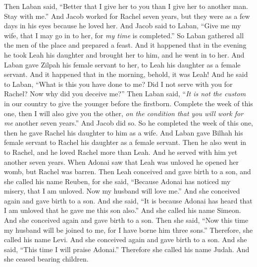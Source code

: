 \begin{biblechapter}
\verse Then Laban said, “Better that I give her to you than I give her to another man. Stay with me.”
\verse And Jacob worked for Rachel seven years, but they were as a few days in his eyes because he loved her.
\verse And Jacob said to Laban, “Give me my wife, that I may go in to her, for \textit{my time} is completed.”
\verse So Laban gathered all the men of the place and prepared a feast.
\verse And it happened that in the evening he took Leah his daughter and brought her to him, and he went in to her.
\verse And Laban gave Zilpah his female servant to her, to Leah his daughter as a female servant.
\verse And it happened that in the morning, behold, it was Leah! And he said to Laban, “What is this you have done to me? Did I not serve with you for Rachel? Now why did you deceive me?”
\verse Then Laban said, “\textit{It is not the custom} in our country to give the younger before the firstborn.
\verse Complete the week of this one, then I will also give you the other, \textit{on the condition that you will work for me} another seven years.”
\verse And Jacob did so. So he completed the week of this one, then he gave Rachel his daughter to him as a wife.
\verse And Laban gave Bilhah his female servant to Rachel his daughter as a female servant.
\verse Then he also went in to Rachel, and he loved Rachel more than Leah. And he served with him yet another seven years.
 When Adonai saw that Leah was unloved he opened her womb, but Rachel was barren.
\verse Then Leah conceived and gave birth to a son, and she called his name Reuben, for she said, “Because Adonai has noticed my misery, that I am unloved. Now my husband will love me.”
\verse And she conceived again and gave birth to a son. And she said, “It is because Adonai has heard that I am unloved that he gave me this son also.” And she called his name Simeon.
\verse And she conceived again and gave birth to a son. Then she said, “Now this time my husband will be joined to me, for I have borne him three sons.” Therefore, she called his name Levi.
\verse And she conceived again and gave birth to a son. And she said, “This time I will praise Adonai.” Therefore she called his name Judah. And she ceased bearing children.
\end{biblechapter}


